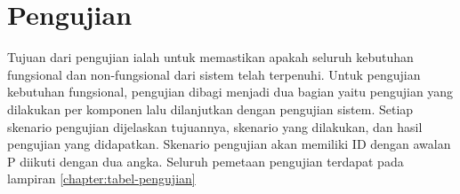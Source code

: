\section{Pengujian}
\label{sec:pengujian}


Tujuan dari pengujian ialah untuk memastikan apakah seluruh kebutuhan fungsional dan non-fungsional dari sistem telah terpenuhi.
Untuk pengujian kebutuhan fungsional, pengujian dibagi menjadi dua bagian yaitu pengujian yang dilakukan per komponen lalu dilanjutkan dengan pengujian sistem. Setiap skenario pengujian dijelaskan tujuannya, skenario yang dilakukan, dan hasil pengujian yang didapatkan. Skenario pengujian akan memiliki ID dengan awalan P diikuti dengan dua angka. Seluruh pemetaan pengujian terdapat pada lampiran \ref{chapter:tabel-pengujian}










